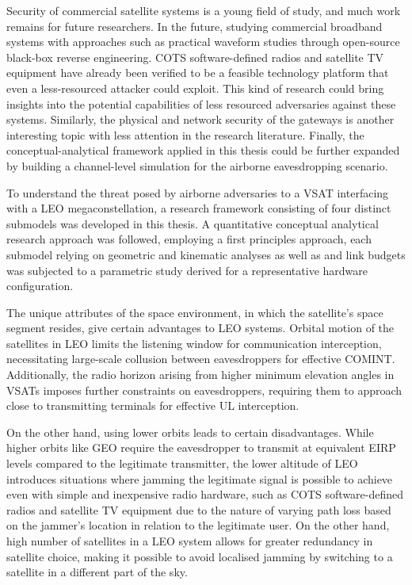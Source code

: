 \documentclass[english, 12pt, a4paper, elec, utf8, a-1b, online]{aaltothesis}
\begin{document}
Security of commercial satellite systems is a young field of study, and much work remains for future researchers.
In the future, studying commercial broadband systems with approaches such as practical waveform studies through open-source black-box reverse engineering.
COTS software-defined radios and satellite TV equipment have already been verified to be a feasible technology platform that even a less-resourced attacker could exploit.
This kind of research could bring insights into the potential capabilities of less resourced adversaries against these systems.
Similarly, the physical and network security of the gateways is another interesting topic with less attention in the research literature.
Finally, the conceptual-analytical framework applied in this thesis could be further expanded by building a channel-level simulation for the airborne eavesdropping scenario.

To understand the threat posed by airborne adversaries to a VSAT interfacing with a LEO megaconstellation, a research framework consisting of four distinct submodels was developed in this thesis.
A quantitative conceptual analytical research approach was followed, employing a first principles approach, each submodel relying on geometric and kinematic analyses as well as and link budgets was subjected to a parametric study derived for a representative hardware configuration.

The unique attributes of the space environment, in which the satellite's space segment resides, give certain advantages to LEO systems.
Orbital motion of the satellites in LEO limits the listening window for communication interception, necessitating large-scale collusion between eavesdroppers for effective COMINT.
Additionally, the radio horizon arising from higher minimum elevation angles in VSATs imposes further constraints on eavesdroppers, requiring them to approach close to transmitting terminals for effective UL interception.

On the other hand, using lower orbits leads to certain disadvantages.
While higher orbits like GEO require the eavesdropper to transmit at equivalent EIRP levels compared to the legitimate transmitter, the lower altitude of LEO introduces situations where jamming the legitimate signal is possible to achieve even with simple and inexpensive radio hardware, such as COTS software-defined radios and satellite TV equipment due to the nature of varying path loss based on the jammer's location in relation to the legitimate user. On the other hand, high number of satellites in a LEO system allows for greater redundancy in satellite choice, making it possible to avoid localised jamming by switching to a satellite in a different part of the sky. 
\end{document}
